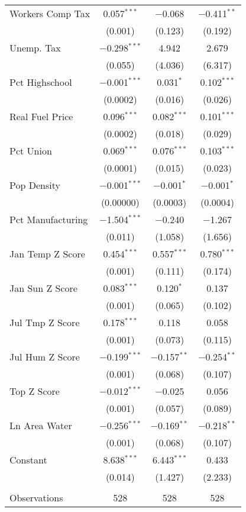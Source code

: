 \begin{table}[!htbp]
\begin{tabular}{@{\extracolsep{5pt}}lccc}
  Workers Comp Tax & 0.057$^{***}$ & $-$0.068 & $-$0.411$^{**}$ \\ 
  & (0.001) & (0.123) & (0.192) \\ 
  Unemp. Tax & $-$0.298$^{***}$ & 4.942 & 2.679 \\ 
  & (0.055) & (4.036) & (6.317) \\ 
  Pct Highschool & $-$0.001$^{***}$ & 0.031$^{*}$ & 0.102$^{***}$ \\ 
  & (0.0002) & (0.016) & (0.026) \\ 
  Real Fuel Price & 0.096$^{***}$ & 0.082$^{***}$ & 0.101$^{***}$ \\ 
  & (0.0002) & (0.018) & (0.029) \\ 
  Pct Union & 0.069$^{***}$ & 0.076$^{***}$ & 0.103$^{***}$ \\ 
  & (0.0001) & (0.015) & (0.023) \\ 
  Pop Density & $-$0.001$^{***}$ & $-$0.001$^{*}$ & $-$0.001$^{*}$ \\ 
  & (0.00000) & (0.0003) & (0.0004) \\ 
  Pct Manufacturing & $-$1.504$^{***}$ & $-$0.240 & $-$1.267 \\ 
  & (0.011) & (1.058) & (1.656) \\ 
  Jan Temp Z Score & 0.454$^{***}$ & 0.557$^{***}$ & 0.780$^{***}$ \\ 
  & (0.001) & (0.111) & (0.174) \\ 
  Jan Sun Z Score & 0.083$^{***}$ & 0.120$^{*}$ & 0.137 \\ 
  & (0.001) & (0.065) & (0.102) \\ 
  Jul Tmp Z Score & 0.178$^{***}$ & 0.118 & 0.058 \\ 
  & (0.001) & (0.073) & (0.115) \\ 
  Jul Hum Z Score & $-$0.199$^{***}$ & $-$0.157$^{**}$ & $-$0.254$^{**}$ \\ 
  & (0.001) & (0.068) & (0.107) \\ 
  Top Z Score & $-$0.012$^{***}$ & $-$0.025 & 0.056 \\ 
  & (0.001) & (0.057) & (0.089) \\ 
  Ln Area Water & $-$0.256$^{***}$ & $-$0.169$^{**}$ & $-$0.218$^{**}$ \\ 
  & (0.001) & (0.068) & (0.107) \\ 
  Constant & 8.638$^{***}$ & 6.443$^{***}$ & 0.433 \\ 
  & (0.014) & (1.427) & (2.233) \\ 
 \hline \\[-1.8ex] 
Observations & 528 & 528 & 528 \\ 

\end{tabular}
\end{table}

